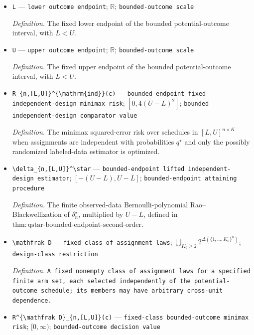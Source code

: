 \documentclass{article}
\begin{document}
\begin{itemize}
  \item \texttt{L} --- \texttt{lower outcome endpoint}; \(\mathbb R\); \texttt{bounded-\allowbreak{}outcome scale}
  \par\smallskip\noindent\emph{Definition.} The fixed lower endpoint of the bounded potential-outcome interval, with \(L<U\).
  \item \texttt{U} --- \texttt{upper outcome endpoint}; \(\mathbb R\); \texttt{bounded-\allowbreak{}outcome scale}
  \par\smallskip\noindent\emph{Definition.} The fixed upper endpoint of the bounded potential-outcome interval, with \(L<U\).
  \item \texttt{R\_\allowbreak{}\{n,\allowbreak{}[L,\allowbreak{}U]\}\allowbreak{}\textasciicircum{}\{\textbackslash{}\allowbreak{}mathrm\{ind\}\allowbreak{}\}\allowbreak{}(c)} --- \texttt{bounded-\allowbreak{}endpoint fixed-\allowbreak{}independent-\allowbreak{}design minimax risk}; \([0,4(U-L)^2]\); \texttt{bounded independent-\allowbreak{}design comparator value}
  \par\smallskip\noindent\emph{Definition.} The minimax squared-error risk over schedules in \([L,U]^{n\times K}\) when assignments are independent with probabilities \(q^\star\) and only the possibly randomized labeled-data estimator is optimized.
  \item \texttt{\textbackslash{}\allowbreak{}delta\_\allowbreak{}\{n,\allowbreak{}[L,\allowbreak{}U]\}\allowbreak{}\textasciicircum{}\textbackslash{}\allowbreak{}star} --- \texttt{bounded-\allowbreak{}endpoint lifted independent-\allowbreak{}design estimator}; \([-(U-L),U-L]\); \texttt{bounded-\allowbreak{}endpoint attaining procedure}
  \par\smallskip\noindent\emph{Definition.} The finite observed-data Bernoulli-polynomial Rao--Blackwellization of \(\delta_n^\star\), multiplied by \(U-L\), defined in \(\mathrm{thm:qstar\text{-}bounded\text{-}endpoint\text{-}second\text{-}order}\).
  \item \texttt{\textbackslash{}\allowbreak{}mathfrak D} --- \texttt{fixed class of assignment laws}; \(\bigcup_{K_0\ge2}2^{\Delta(\{1,\ldots,K_0\}^n)}\); \texttt{design-\allowbreak{}class restriction}
  \par\smallskip\noindent\emph{Definition.} \texttt{A fixed nonempty class of assignment laws for a specified finite arm set,\allowbreak{} each selected independently of the potential-\allowbreak{}outcome schedule;\allowbreak{} its members may have arbitrary cross-\allowbreak{}unit dependence.}
  \item \texttt{R\textasciicircum{}\{\textbackslash{}\allowbreak{}mathfrak D\}\allowbreak{}\_\allowbreak{}\{n,\allowbreak{}[L,\allowbreak{}U]\}\allowbreak{}(c)} --- \texttt{fixed-\allowbreak{}class bounded-\allowbreak{}outcome minimax risk}; \([0,\infty)\); \texttt{bounded-\allowbreak{}outcome decision value}

\end{itemize}
\end{document}
